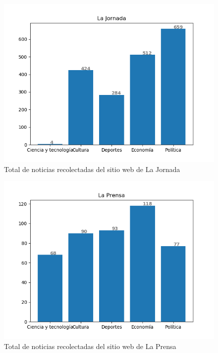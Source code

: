 \begin{figure}[H]
	\centering
	\includegraphics[scale=.45]{imagenes/Capitulo5/jornada.png}
	\caption{Total de noticias recolectadas del sitio web de La Jornada}
	\label{Fig:notsitiojornada}
\end{figure}

\begin{figure}[H]
	\centering
	\includegraphics[scale=.45]{imagenes/Capitulo5/prensa.png}
	\caption{Total de noticias recolectadas del sitio web de La Prensa}
	\label{Fig:notsitioprensa}
\end{figure}

